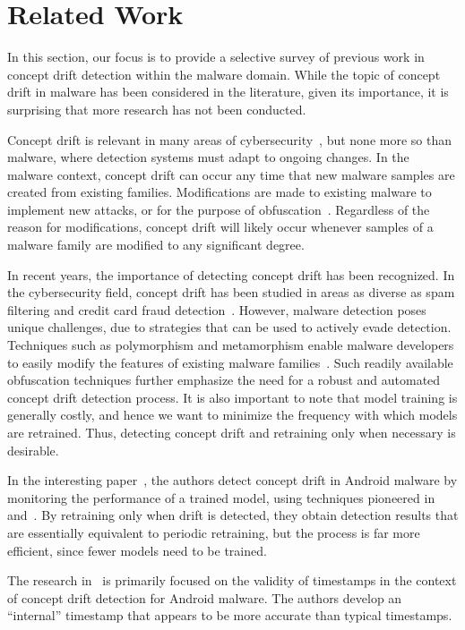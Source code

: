 \section{Related Work}
\label{sect:rw}

In this section, our focus is to provide a selective survey of previous work in concept drift detection 
within the malware domain. While the topic of concept drift in malware has been considered in the 
literature, given its importance, it is surprising that more research has not been conducted.

Concept drift is relevant in many areas of cybersecurity~\cite{9027485}, but none more so than 
malware, where detection systems must adapt to ongoing changes. In the malware context,
concept drift can occur any time that new malware samples are created from existing families. 
Modifications are made to existing malware to implement new attacks, or for the 
purpose of obfuscation~\cite{10.1145/2381896.2381910}. Regardless of the reason for modifications,
concept drift will likely occur whenever samples of a malware family are 
modified to any significant degree. 

In recent years, the importance of detecting concept drift has been recognized. In the cybersecurity field, 
concept drift has been studied in areas as diverse as spam filtering and credit card fraud detection~\cite{Jog}. 
However, malware detection poses unique challenges, due to strategies that can be used to actively 
evade detection. Techniques such as polymorphism and metamorphism enable malware developers
to easily modify the features of existing malware families~\cite{Sharma_2014}. Such 
readily available obfuscation techniques further emphasize the need for a robust and automated 
concept drift detection process. It is also important to note that model training is generally
costly, and hence we want to minimize the frequency with which models are retrained.
Thus, detecting concept drift and retraining only when necessary is desirable.

In the interesting paper~\cite{Molina}, the authors detect concept drift in Android 
malware by monitoring the performance of a trained model, using techniques pioneered 
in~\cite{Page} and~\cite{Hinckley}. By retraining only when drift is detected,
they obtain detection results that are essentially equivalent to periodic retraining,
but the process is far more efficient, since fewer models need to be trained.

The research in~\cite{Alejandro} is primarily focused on the validity of timestamps in
the context of concept drift detection for Android malware. The authors develop 
an ``internal'' timestamp that appears to be more accurate than 
typical timestamps.


